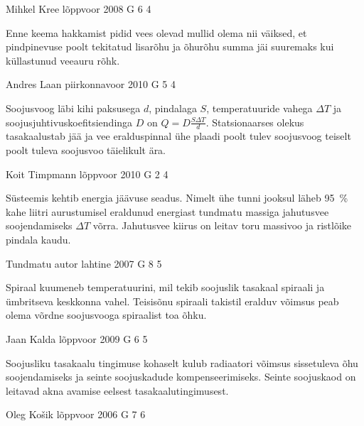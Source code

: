 \documentclass[11pt, twoside]{article}
\begin{document}
{%
{Mihkel Kree} %
{lõppvoor} %
{2008} %
{G 6} %
{4} %
{

\ifHint
Enne keema hakkamist pidid vees olevad mullid olema nii väiksed, et pindpinevuse poolt tekitatud lisarõhu ja õhurõhu summa jäi suuremaks kui küllastunud veeauru rõhk.
\fi
}

{Andres Laan} %
{piirkonnavoor} %
{2010} %
{G 5} %
{4} %
{

\ifHint
Soojusvoog läbi kihi paksusega $d$, pindalaga $S$, temperatuuride vahega $\Delta T$ ja soojusjuhtivuskoefitsiendinga $D$ on $Q = D\frac{S\Delta T}{d}$. Statsionaarses olekus tasakaalustab jää ja vee eralduspinnal ühe plaadi poolt tulev soojusvoog teiselt poolt tuleva soojusvoo täielikult ära. 
\fi
}

{Koit Timpmann} %
{lõppvoor} %
{2010} %
{G 2} %
{4} %
{

\ifHint
Süsteemis kehtib energia jäävuse seadus. Nimelt ühe tunni jooksul läheb \SI{95}{\%} kahe liitri aurustumisel eraldunud energiast tundmatu massiga jahutusvee soojendamiseks $\Delta T$ võrra. Jahutusvee kiirus on leitav toru massivoo ja ristlõike pindala kaudu.
\fi
}

{Tundmatu autor} %
{lahtine} %
{2007} %
{G 8} %
{5} %
{

\ifHint
Spiraal kuumeneb temperatuurini, mil tekib soojuslik tasakaal spiraali ja ümbritseva keskkonna vahel. Teisisõnu spiraali takistil eralduv võimsus peab olema võrdne soojusvooga spiraalist toa õhku.
\fi
}

{Jaan Kalda} %
{lõppvoor} %
{2009} %
{G 6} %
{5} %
{

\ifHint
Soojusliku tasakaalu tingimuse kohaselt kulub radiaatori võimsus sissetuleva õhu soojendamiseks ja seinte soojuskadude kompenseerimiseks. Seinte soojuskaod on leitavad akna avamise eelsest tasakaalutingimusest.
\fi
}

{Oleg Košik} %
{lõppvoor} %
{2006} %
{G 7} %
{6} %
{

}}
\end{document}
